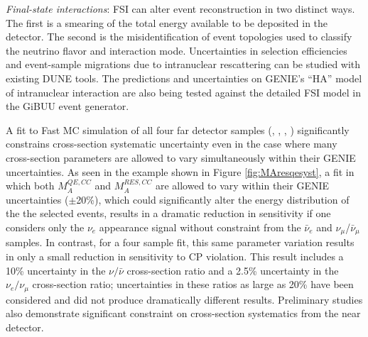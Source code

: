   \emph{Final-state interactions}: FSI can alter event reconstruction in two distinct ways. The first is a smearing
  of the total energy available to be deposited in the detector. The second is the misidentification of
  event topologies used to classify the neutrino flavor and interaction mode. Uncertainties in selection
  efficiencies and event-sample migrations
  due to intranuclear rescattering can be studied with existing DUNE tools. The predictions and
  uncertainties on GENIE's ``HA'' model of intranuclear interaction
  are also being tested against the detailed FSI model in the GiBUU event
  generator.

A fit to Fast MC simulation of all four far detector samples
(\nue, \anue, \numu, \anumu) significantly
constrains cross-section systematic uncertainty even in the case where many
cross-section parameters are allowed to vary simultaneously within their
GENIE uncertainties. As seen in the example shown in Figure
\ref{fig:MAresqesyst}, 
a fit in which both $M_A^{QE,CC}$ and 
$M_A^{RES,CC}$ are allowed to vary within their GENIE uncertainties 
($\pm$20\%), which could significantly alter the energy distribution of the 
the selected events, results in a dramatic reduction in sensitivity if one 
considers only the $\nu_e$ appearance signal without constraint from the 
$\bar{\nu}_e$ and $\nu_{\mu}$/$\bar{\nu}_{\mu}$ samples.
In contrast, for a four sample fit,
this same parameter variation results in only a small reduction in
sensitivity to CP violation.
This result includes a 10\% uncertainty in the $\nu/\bar{\nu}$
cross-section ratio and a 2.5\% uncertainty in the $\nu_e/\nu_{\mu}$
cross-section ratio; uncertainties in these ratios as large as 20\% have
been considered and did not produce dramatically different results.
Preliminary studies also
demonstrate significant constraint on cross-section systematics from the 
near detector. 
%
